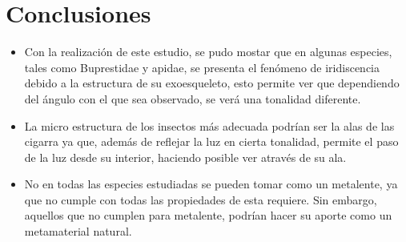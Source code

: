 \documentclass[a4paper, twocolumn, 10pt]{article}
\begin{document}
\section*{Conclusiones}

\begin{itemize}
    \item Con la realización de este estudio, se pudo mostar que en algunas especies, tales como Buprestidae y apidae, se presenta el fenómeno de iridiscencia debido a la estructura de su exoesqueleto, esto permite ver que dependiendo del ángulo con el que sea observado, se verá una tonalidad diferente.
    
    \item La micro estructura de los insectos más adecuada podrían ser la alas de las cigarra ya que, además de reflejar la luz en cierta tonalidad, permite el paso de la luz desde su interior, haciendo posible ver através de su ala.
    
    \item No en todas las especies estudiadas se pueden tomar como un metalente, ya que no cumple con todas las propiedades de esta requiere. Sin embargo, aquellos que no cumplen para metalente, podrían hacer su aporte como un metamaterial natural.
\end{itemize}

\printbibliography
\end{document}
